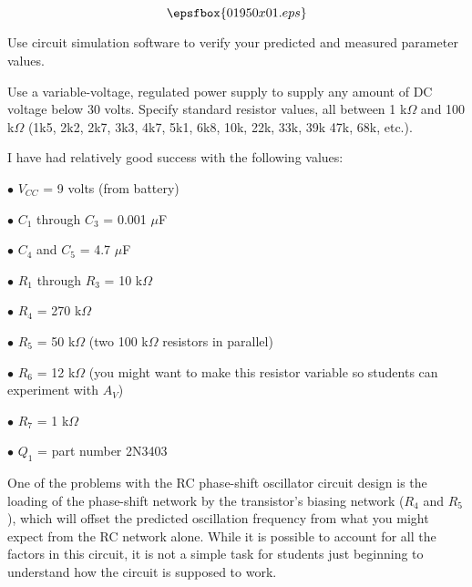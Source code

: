 

$$\epsfbox{01950x01.eps}$$

\vfil \eject






Use circuit simulation software to verify your predicted and measured parameter values.







Use a variable-voltage, regulated power supply to supply any amount of DC voltage below 30 volts.  Specify standard resistor values, all between 1 k$\Omega$ and 100 k$\Omega$ (1k5, 2k2, 2k7, 3k3, 4k7, 5k1, 6k8, 10k, 22k, 33k, 39k 47k, 68k, etc.). 

I have had relatively good success with the following values:

\medskip
\item{$\bullet$} $V_{CC}$ = 9 volts (from battery)
\item{$\bullet$} $C_1$ through $C_3$ = 0.001 $\mu$F
\item{$\bullet$} $C_4$ and $C_5$ = 4.7 $\mu$F
\item{$\bullet$} $R_1$ through $R_3$ = 10 k$\Omega$
\item{$\bullet$} $R_4$ = 270 k$\Omega$
\item{$\bullet$} $R_5$ = 50 k$\Omega$ (two 100 k$\Omega$ resistors in parallel)
\item{$\bullet$} $R_6$ = 12 k$\Omega$ (you might want to make this resistor variable so students can  experiment with $A_V$)
\item{$\bullet$} $R_7$ = 1 k$\Omega$
\item{$\bullet$} $Q_1$ = part number 2N3403
\medskip

One of the problems with the RC phase-shift oscillator circuit design is the loading of the phase-shift network by the transistor's biasing network ($R_4$ and $R_5$), which will offset the predicted oscillation frequency from what you might expect from the RC network alone.  While it is possible to account for all the factors in this circuit, it is not a simple task for students just beginning to understand how the circuit is supposed to work.

